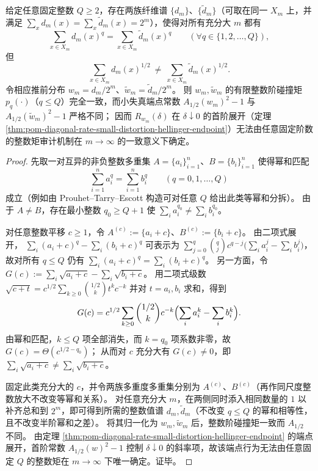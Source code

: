 \begin{theorem}[有限整数碰撞矩不足以替代 \texorpdfstring{$q=\tfrac12$}{q=1/2} 端点常数]\label{thm:pom-finite-integer-moments-cannot-replace-half}
给定任意固定整数 \(Q\ge 2\)，存在两族纤维谱 \(\{d_m\}\)、\(\{\widetilde d_m\}\)（可取在同一 \(X_m\) 上，并满足 \(\sum_x d_m(x)=\sum_x \widetilde d_m(x)=2^m\)），使得对所有充分大 \(m\) 都有
\[
\sum_{x\in X_m} d_m(x)^q=\sum_{x\in X_m}\widetilde d_m(x)^q\qquad(\forall q\in\{1,2,\dots,Q\}),
\]
但
\[
\sum_{x\in X_m} d_m(x)^{1/2}\ \ne\ \sum_{x\in X_m}\widetilde d_m(x)^{1/2}.
\]
令相应推前分布 \(w_m=d_m/2^m\)、\(\widetilde w_m=\widetilde d_m/2^m\)。
则 \(w_m,\widetilde w_m\) 的有限整数阶碰撞矩 \(p_q(\cdot)\)（\(q\le Q\)）完全一致，而小失真端点常数 \(A_{1/2}(w_m)^2-1\) 与 \(A_{1/2}(\widetilde w_m)^2-1\) 严格不同；
因而 \(R_{w_m}(\delta)\) 在 \(\delta\downarrow 0\) 的首阶展开（定理 \ref{thm:pom-diagonal-rate-small-distortion-hellinger-endpoint}）无法由任意固定阶数的整数矩审计机制在 \(m\to\infty\) 的一致意义下确定。
\end{theorem}
\begin{proof}
先取一对互异的非负整数多重集 \(A=\{a_i\}_{i=1}^n\)、\(B=\{b_i\}_{i=1}^n\) 使得幂和匹配
\[
\sum_{i=1}^n a_i^q=\sum_{i=1}^n b_i^q\qquad(q=0,1,\dots,Q)
\]
成立（例如由 Prouhet--Tarry--Escott 构造可对任意 \(Q\) 给出此类等幂和分拆）。
由于 \(A\neq B\)，存在最小整数 \(q_0\ge Q+1\) 使 \(\sum_i a_i^{q_0}\ne \sum_i b_i^{q_0}\)。
\par
对任意整数平移 \(c\ge 1\)，令 \(A^{(c)}:=\{a_i+c\}\)、\(B^{(c)}:=\{b_i+c\}\)。
由二项式展开，
\(
\sum_i (a_i+c)^q-\sum_i (b_i+c)^q
\)
可表示为 \(\sum_{j=0}^q \binom{q}{j}c^{q-j}\bigl(\sum_i a_i^j-\sum_i b_i^j\bigr)\)，
故对所有 \(q\le Q\) 仍有 \(\sum_i (a_i+c)^q=\sum_i (b_i+c)^q\)。
另一方面，令
\(
G(c):=\sum_i \sqrt{a_i+c}-\sum_i \sqrt{b_i+c}
\)。
用二项式级数
\(
\sqrt{c+t}=c^{1/2}\sum_{k\ge 0}\binom{1/2}{k}t^k c^{-k}
\)
并对 \(t=a_i,b_i\) 求和，得到
\[
G(c)
=c^{1/2}\sum_{k\ge 0}\binom{1/2}{k}c^{-k}\Bigl(\sum_i a_i^k-\sum_i b_i^k\Bigr).
\]
由幂和匹配，\(k\le Q\) 项全部消失，而 \(k=q_0\) 项系数非零，故 \(G(c)=\Theta(c^{1/2-q_0})\)；
从而对 \(c\) 充分大有 \(G(c)\ne 0\)，即 \(\sum_i \sqrt{a_i+c}\ne \sum_i \sqrt{b_i+c}\)。
\par
固定此类充分大的 \(c\)，并令两族多重度多重集分别为 \(A^{(c)}\)、\(B^{(c)}\)（再作同尺度整数放大不改变等幂和关系）。
对任意充分大 \(m\)，在两侧同时添入相同数量的 \(1\) 以补齐总和到 \(2^m\)，即可得到所需的整数值谱 \(d_m,\widetilde d_m\)（不改变 \(q\le Q\) 的幂和相等性，且不改变半阶幂和之差）。
将其归一化为 \(w_m,\widetilde w_m\) 后，整数阶碰撞矩一致而 \(A_{1/2}\) 不同。
由定理 \ref{thm:pom-diagonal-rate-small-distortion-hellinger-endpoint} 的端点展开，首阶常数 \(A_{1/2}(w)^2-1\) 控制 \(\delta\downarrow 0\) 的斜率项，故该端点行为无法由任意固定 \(Q\) 的整数矩在 \(m\to\infty\) 下唯一确定。证毕。
\end{proof}



